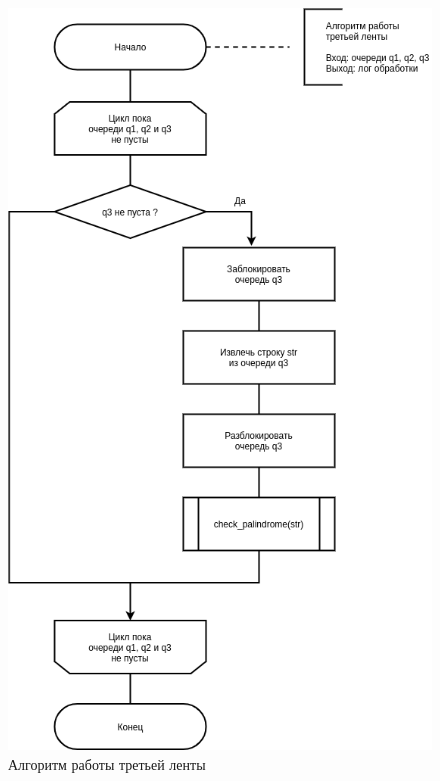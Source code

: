 \begin{figure}[H]
	\begin{center}
		\includegraphics[scale=0.5]{img/third.png}
	\end{center}
	\captionsetup{justification=centering}
	\caption{Алгоритм работы третьей ленты}
	\label{img:third}
\end{figure}


